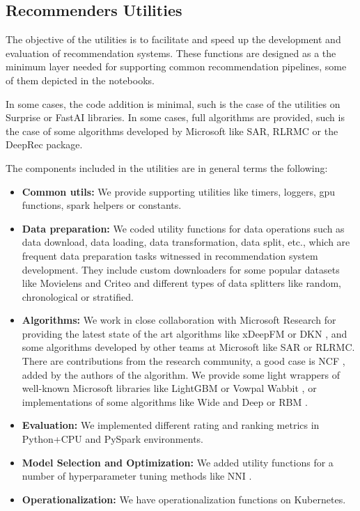 \subsection{Recommenders Utilities}

The objective of the utilities is to facilitate and speed up the development and evaluation of recommendation systems.
These functions are designed as a the minimum layer needed for supporting common recommendation pipelines, some of 
them depicted in the notebooks. 

In some cases, the code addition is minimal, such is the case of the utilities on Surprise \cite{Surprise} or 
FastAI \cite{howard2018fastai} libraries. In some cases, full algorithms are provided, such is the case of 
some algorithms developed by Microsoft like SAR, RLRMC or the DeepRec package.

The components included in the utilities are in general terms the following: 
\begin{itemize}
    \item \textbf{Common utils:} We provide supporting utilities like timers, loggers, gpu functions, 
    spark helpers or constants.
    \item \textbf{Data preparation:} We coded utility functions for data operations 
    such as data download, data loading, data transformation, data split, etc., which are frequent data preparation 
    tasks witnessed in recommendation system development. They include custom downloaders for some
    popular datasets like Movielens and Criteo and different types of data splitters like random, chronological or
    stratified.     
    \item \textbf{Algorithms:} We work in close collaboration with Microsoft Research for providing the latest state of
    the art algorithms like xDeepFM \cite{lian2018xdeepfm} or DKN \cite{wang2018dkn}, and some algorithms developed by other
    teams at Microsoft like SAR or RLRMC. There are contributions from the research community, a good case is NCF 
    \cite{he2017neural}, added by the authors of the algorithm. We provide some light wrappers of well-known Microsoft
    libraries like LightGBM \cite{ke2017lightgbm} or Vowpal Wabbit \cite{agarwal2014reliable}, or implementations
    of some algorithms like Wide and Deep \cite{cheng2016wide} or RBM \cite{salakhutdinov2007restricted}. 
    \item \textbf{Evaluation:} We implemented different rating and ranking metrics in Python+CPU and PySpark environments.
    \item \textbf{Model Selection and Optimization:} We added utility functions for a number of hyperparameter 
    tuning methods like NNI \cite{nni}. 
    \item \textbf{Operationalization:} We have operationalization functions on Kubernetes.
\end{itemize}
    

